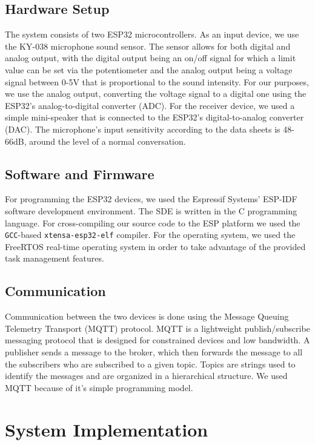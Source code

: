 \documentclass[conference]{IEEEtran}
\begin{document}
\subsection{Hardware Setup}
The system consists of two ESP32\cite{ESP32_Manual} microcontrollers.
As an input device, we use the KY-038\cite{KY-038} microphone sound sensor.
The sensor allows for both digital and analog output, with the digital output being an
on/off signal for which a limit value can be set via the potentiometer and the analog output being a voltage signal between 0-5V that is proportional to the sound intensity.
For our purposes, we use the analog output, converting the voltage signal to a digital one using the
ESP32's analog-to-digital converter (ADC).
For the receiver device, we used a simple mini-speaker that is connected to the ESP32's digital-to-analog converter (DAC).
The microphone's input sensitivity according to the data sheets is 48-66dB, around the level of a normal conversation.

\subsection{Software and Firmware}

For programming the ESP32 devices, we used the Espressif Systems' ESP-IDF\cite{ESP-IDF}
software development environment. The SDE is written in the C programming 
language. For cross-compiling our source code to the ESP platform we used the \texttt{GCC}-based
\texttt{xtensa-esp32-elf} compiler. 
For the operating system, we used the FreeRTOS\cite{FreeRTOS} real-time operating system
in order to take advantage of the provided task management features.
\subsection{Communication}

Communication between the two devices is done using the Message Queuing Telemetry Transport (MQTT) protocol\cite{MQTT_Survey}.
MQTT is a lightweight publish/subscribe messaging protocol that is designed for constrained devices and low bandwidth.
A publisher sends a message to the broker, which then forwards the message to all the subscribers who are subscribed to a given topic.
Topics are strings used to identify the messages and are organized in a hierarchical structure.
We used MQTT because of it's simple programming model.

\section{System Implementation}
\label{sec:system_implementation}
\end{document}

